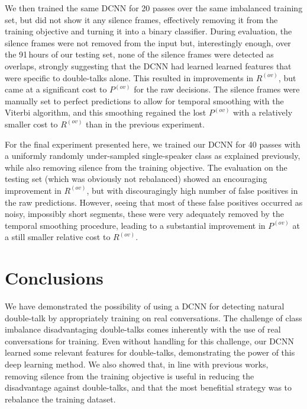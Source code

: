 \documentclass[a4paper]{article}
\begin{document}
We then trained the same DCNN for 20 passes over the same imbalanced training set,
but did not show it any silence frames, effectively removing it from the training objective and turning it into a binary classifier.
During evaluation, the silence frames were not removed from the input but,
interestingly enough, over the 91\,hours of our testing set,
none of the silence frames were detected as overlaps,
strongly suggesting that the DCNN had learned learned features that were specific to double-talks alone.
This resulted in improvements in $R^{(ov)}$, but came at a significant cost to $P^{(ov)}$ for the raw decisions.
The silence frames were manually set to perfect predictions to allow for temporal smoothing with the Viterbi algorithm,
and this smoothing regained the lost $P^{(ov)}$ with a relatively smaller cost to $R^{(ov)}$ than in the previous experiment.

For the final experiment presented here,
we trained our DCNN for 40 passes with a uniformly randomly under-sampled single-speaker class as explained previously, while also removing silence from the training objective.
The evaluation on the testing set (which was obviously not rebalanced) showed an encouraging improvement in $R^{(ov)}$,
but with discouragingly high number of false positives in the raw predictions.
However, seeing that most of these false positives occurred as noisy, impossibly short segments,
these were very adequately removed by the temporal smoothing procedure,
leading to a substantial improvement in $P^{(ov)}$ at a still smaller relative cost to $R^{(ov)}$.

\section{Conclusions}
We have demonstrated the possibility of using a DCNN for detecting natural double-talk by appropriately training on real conversations.
The challenge of class imbalance disadvantaging double-talks comes inherently with the use of real conversations for training.
Even without handling for this challenge, our DCNN learned some relevant features for double-talks,
demonstrating the power of this deep learning method.
We also showed that, in line with previous works,
removing silence from the training objective is useful in reducing the disadvantage against double-talks,
and that the most benefitial strategy was to rebalance the training dataset.
\end{document}
